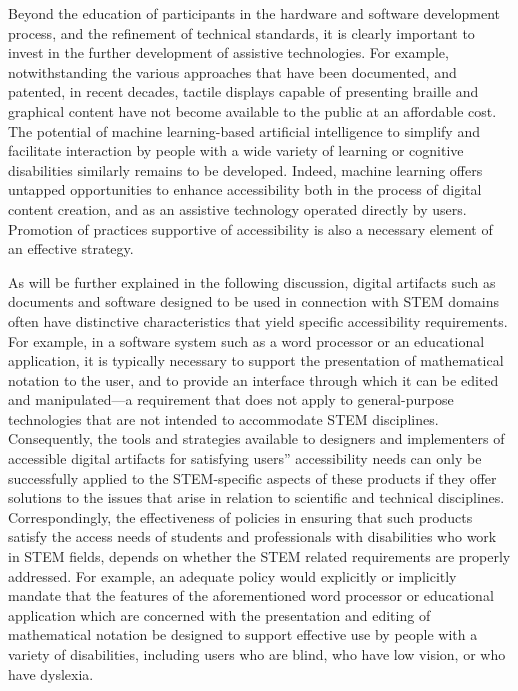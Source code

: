 \documentclass{sig-alternate} %
\begin{document}
\begin{large}
Beyond the education of participants in the hardware and software development process, and the refinement of technical standards, it is clearly important to invest in the further development of assistive technologies. For example, notwithstanding the various approaches that have been documented, and patented, in recent decades, tactile displays capable of presenting braille and graphical content have not become available to the public at an affordable cost. The potential of machine learning-based artificial intelligence to simplify and facilitate interaction by people with a wide variety of learning or cognitive disabilities similarly remains to be developed. Indeed, machine learning offers untapped opportunities to enhance accessibility both in the process of digital content creation, and as an assistive technology operated directly by users. Promotion of practices supportive of accessibility is also a necessary element of an effective strategy.

As will be further explained in the following discussion, digital artifacts such as documents and software designed to be used in connection with STEM domains often have distinctive characteristics that yield specific accessibility requirements. For example, in a software system such as a word processor or an educational application, it is typically necessary to support the presentation of mathematical notation to the user, and to provide an interface through which it can be edited and manipulated—a requirement that does not apply to general-purpose technologies that are not intended to accommodate STEM disciplines. Consequently, the tools and strategies available to designers and implementers of accessible digital artifacts for satisfying users” accessibility needs can only be successfully applied to the STEM-specific aspects of these products if they offer solutions to the issues that arise in relation to scientific and technical disciplines. Correspondingly, the effectiveness of policies in ensuring that such products satisfy the access needs of students and professionals with disabilities who work in STEM fields, depends on whether the STEM related requirements are properly addressed. For example, an adequate policy would explicitly or implicitly mandate that the features of the aforementioned word processor or educational application which are concerned with the presentation and editing of mathematical notation be designed to support effective use by people with a variety of disabilities, including users who are blind, who have low vision, or who have dyslexia.


\end{large}
\end{document}
